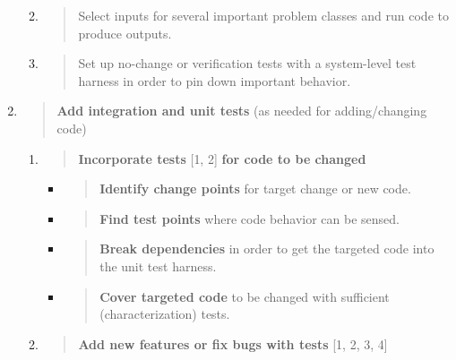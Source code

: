 \documentclass[]{article}
\begin{document}
\begin{enumerate}
  \begin{enumerate}
  \def\labelenumii{\alph{enumii}.}
  \item
    \begin{quote}
    Select inputs for several important problem classes and run code to
    produce outputs.
    \end{quote}
  \item
    \begin{quote}
    Set up no-change or verification tests with a system-level test
    harness in order to pin down important behavior.
    \end{quote}
  \end{enumerate}
\item
  \begin{quote}
  \textbf{Add integration and unit tests} (as needed for adding/changing
  code)
  \end{quote}

  \begin{enumerate}
  \def\labelenumii{\alph{enumii}.}
  \item
    \begin{quote}
    \textbf{Incorporate tests} {[}1, 2{]} \textbf{for code to be
    changed}
    \end{quote}

    \begin{itemize}
    \item
      \begin{quote}
      \textbf{Identify change points} for target change or new code.
      \end{quote}
    \item
      \begin{quote}
      \textbf{Find test points} where code behavior can be sensed.
      \end{quote}
    \item
      \begin{quote}
      \textbf{Break dependencies} in order to get the targeted code into
      the unit test harness.
      \end{quote}
    \item
      \begin{quote}
      \textbf{Cover targeted code} to be changed with sufficient
      (characterization) tests.
      \end{quote}
    \end{itemize}
  \item
    \begin{quote}
    \textbf{Add new features or fix bugs with tests} {[}1, 2, 3, 4{]}
    \end{quote}


\end{enumerate}
\end{enumerate}
\end{document}

